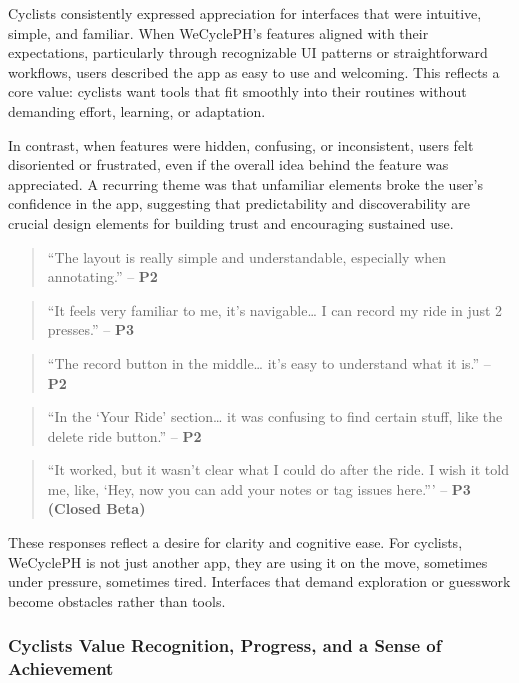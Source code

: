 Cyclists consistently expressed appreciation for interfaces that were intuitive, simple, and familiar. When WeCyclePH's features aligned with their expectations, particularly through recognizable UI patterns or straightforward workflows, users described the app as easy to use and welcoming. This reflects a core value: cyclists want tools that fit smoothly into their routines without demanding effort, learning, or adaptation.

In contrast, when features were hidden, confusing, or inconsistent, users felt disoriented or frustrated, even if the overall idea behind the feature was appreciated. A recurring theme was that unfamiliar elements broke the user's confidence in the app, suggesting that predictability and discoverability are crucial design elements for building trust and encouraging sustained use.

\begin{quote}
``The layout is really simple and understandable, especially when annotating.'' – \textbf{P2}
\end{quote}

\begin{quote}
``It feels very familiar to me, it's navigable… I can record my ride in just 2 presses.'' – \textbf{P3}
\end{quote}

\begin{quote}
``The record button in the middle… it's easy to understand what it is.'' – \textbf{P2}
\end{quote}

\begin{quote}
``In the ‘Your Ride' section… it was confusing to find certain stuff, like the delete ride button.'' – \textbf{P2}
\end{quote}

\begin{quote}
``It worked, but it wasn't clear what I could do after the ride. I wish it told me, like, ‘Hey, now you can add your notes or tag issues here.''' – \textbf{P3 (Closed Beta)}
\end{quote}

These responses reflect a desire for clarity and cognitive ease. For cyclists, WeCyclePH is not just another app, they are using it on the move, sometimes under pressure, sometimes tired. Interfaces that demand exploration or guesswork become obstacles rather than tools.

\subsubsection{Cyclists Value Recognition, Progress, and a Sense of Achievement}

